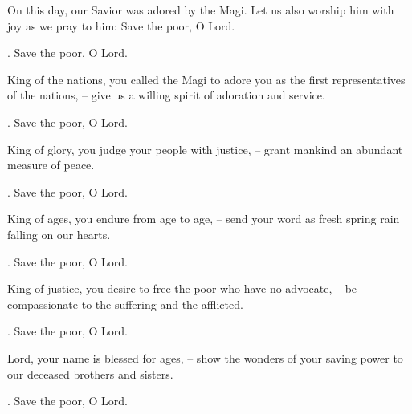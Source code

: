 \lettrine[loversize=0.15,lines=2]{O}{}n this day, our Savior was adored by the Magi. Let us also worship him with joy as we pray to him: Save the poor, O Lord.
\par \Rbar. Save the poor, O Lord.

King of the nations, you called the Magi to adore you as the first representatives of the nations,
– give us a willing spirit of adoration and service.
\par \Rbar. Save the poor, O Lord.

King of glory, you judge your people with justice,
– grant mankind an abundant measure of peace.
\par \Rbar. Save the poor, O Lord.

King of ages, you endure from age to age,
– send your word as fresh spring rain falling on our hearts.
\par \Rbar. Save the poor, O Lord.

King of justice, you desire to free the poor who have no advocate,
– be compassionate to the suffering and the afflicted.
\par \Rbar. Save the poor, O Lord.

Lord, your name is blessed for ages,
– show the wonders of your saving power to our deceased brothers and sisters.
\par \Rbar. Save the poor, O Lord.
